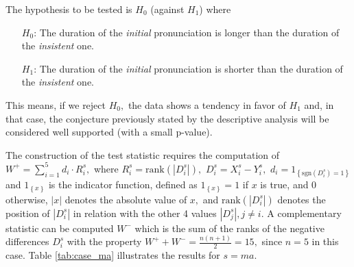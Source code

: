 \documentclass[11pt]{article}
\begin{document}
The hypothesis to be tested is $H_0$ (against $H_1$) where
\begin{itemize}
    \setlength{\itemindent}{4em}    
    \item[$H_0$:] The duration of the {\it{initial}} pronunciation is longer than the duration of the {\it{insistent}} one. 
    \item[$H_1$:] The duration of the {\it{initial}} pronunciation is shorter than the duration of the {\it{insistent}} one. 
\end{itemize}
This means, if we reject $H_0,$ the data shows a tendency in favor of $H_1$ and, in that case, the conjecture previously stated by the descriptive analysis will be considered well supported (with a small p-value).


The construction of the test statistic requires the computation of $W^+ = \sum_{i=1}^{5} d_i\cdot R_i^{s},$ where $R_i^{s} = \textrm{rank}\left( \left| D_i^{s} \right| \right),$ $D_i^{s} = X_i^{s} - Y_i^{s},$ $d_i = 1_{\left\{\textrm{sgn}\left(D_i^s \right)=1\right\}}$ and $1_{\left\{x\right\}}$ is the indicator function, defined as $1_{\left\{x\right\}}=1$ if $x$ is true, and $0$ otherwise, $|x|$ denotes the absolute value of $x,$ and  $\textrm{rank}\left( \left| D_i^{s} \right| \right)$ denotes the position of $|D_i^s|$ in relation with the other 4 values $|D_j^s|, j \neq i.$  
A complementary statistic can be computed $W^-$ which is the sum of the ranks of the negative differences $D_i^{s}$ with the property $W^+ + W^-=\frac{n(n+1)}{2}=15,$ since $n=5$ in this case. Table \ref{tab:case_ma} illustrates the results for $s=ma.$

\end{document}

